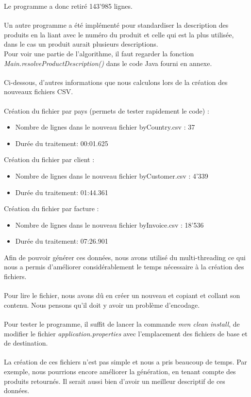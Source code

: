\documentclass[a4paper]{article}
\begin{document}
\vspace{6pt}
Le programme a donc retiré 143'985 lignes.
\\\\
Un autre programme a été implémenté pour standardiser la description des produits en la liant avec le numéro du produit et celle qui est la plus utilisée, dans le cas un produit aurait plusieurs descriptions. \\
Pour voir une partie de l'algorithme, il faut regarder la fonction \textit{Main.resolveProductDescription()} dans le code Java fourni en annexe.
\\\\
Ci-dessous, d'autres informations que nous calculons lors de la création des nouveaux fichiers CSV.
\\\\
Création du fichier par pays (permets de tester rapidement le code) :
\begin{itemize}
	\item Nombre de lignes dans le nouveau fichier byCountry.csv : 37
	\item Durée du traitement: 00:01.625
\end{itemize}
\vspace{6pt}

Création du fichier par client :
\begin{itemize}
	\item Nombre de lignes dans le nouveau fichier byCustomer.csv : 4'339
	\item Durée du traitement: 01:44.361
\end{itemize}

\vspace{6pt}

Création du fichier par facture :
\begin{itemize}
	\item Nombre de lignes dans le nouveau fichier byInvoice.csv : 18'536
	\item Durée du traitement: 07:26.901
\end{itemize}

\vspace{6pt}

Afin de pouvoir générer ces données, nous avons utilisé du multi-threading ce qui nous a permis d'améliorer considérablement le temps nécessaire à la création des fichiers.
\\\\
Pour lire le fichier, nous avons dû en créer un nouveau et copiant et collant son contenu. Nous pensons qu'il doit y avoir un problème d'encodage. 
\\\\
Pour tester le programme, il suffit de lancer la commande \textit{mvn clean install}, de modifier le fichier \textit{application.properties} avec l'emplacement des fichiers de base et de destination.
\\\\
La création de ces fichiers n'est pas simple et nous a pris beaucoup de temps. Par exemple, nous pourrions encore améliorer la génération, en tenant compte des produits retournés.
Il serait aussi bien d'avoir un meilleur descriptif de ces données.
\end{document}
